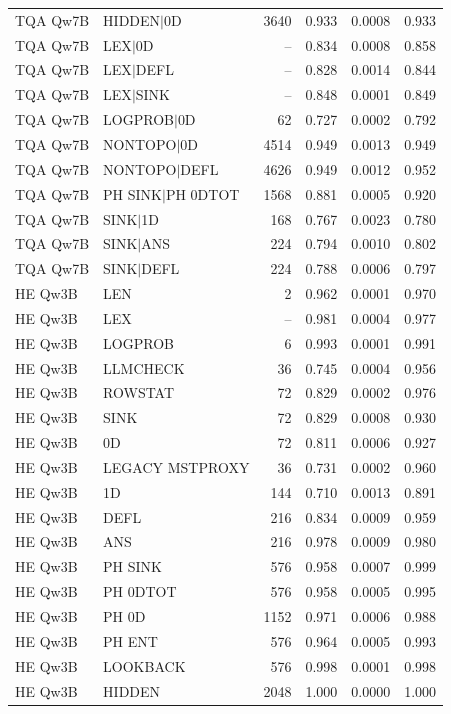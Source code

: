 \begin{longtable}{llrrrr}
TQA Qw7B & HIDDEN$\mid$0D & 3640 & 0.933 & 0.0008 & 0.933 \\
TQA Qw7B & LEX$\mid$0D & -- & 0.834 & 0.0008 & 0.858 \\
TQA Qw7B & LEX$\mid$DEFL & -- & 0.828 & 0.0014 & 0.844 \\
TQA Qw7B & LEX$\mid$SINK & -- & 0.848 & 0.0001 & 0.849 \\
TQA Qw7B & LOGPROB$\mid$0D & 62 & 0.727 & 0.0002 & 0.792 \\
TQA Qw7B & NONTOPO$\mid$0D & 4514 & 0.949 & 0.0013 & 0.949 \\
TQA Qw7B & NONTOPO$\mid$DEFL & 4626 & 0.949 & 0.0012 & 0.952 \\
TQA Qw7B & PH SINK$\mid$PH 0DTOT & 1568 & 0.881 & 0.0005 & 0.920 \\
TQA Qw7B & SINK$\mid$1D & 168 & 0.767 & 0.0023 & 0.780 \\
TQA Qw7B & SINK$\mid$ANS & 224 & 0.794 & 0.0010 & 0.802 \\
TQA Qw7B & SINK$\mid$DEFL & 224 & 0.788 & 0.0006 & 0.797 \\
HE Qw3B & LEN & 2 & 0.962 & 0.0001 & 0.970 \\
HE Qw3B & LEX & -- & 0.981 & 0.0004 & 0.977 \\
HE Qw3B & LOGPROB & 6 & 0.993 & 0.0001 & 0.991 \\
HE Qw3B & LLMCHECK & 36 & 0.745 & 0.0004 & 0.956 \\
HE Qw3B & ROWSTAT & 72 & 0.829 & 0.0002 & 0.976 \\
HE Qw3B & SINK & 72 & 0.829 & 0.0008 & 0.930 \\
HE Qw3B & 0D & 72 & 0.811 & 0.0006 & 0.927 \\
HE Qw3B & LEGACY MSTPROXY & 36 & 0.731 & 0.0002 & 0.960 \\
HE Qw3B & 1D & 144 & 0.710 & 0.0013 & 0.891 \\
HE Qw3B & DEFL & 216 & 0.834 & 0.0009 & 0.959 \\
HE Qw3B & ANS & 216 & 0.978 & 0.0009 & 0.980 \\
HE Qw3B & PH SINK & 576 & 0.958 & 0.0007 & 0.999 \\
HE Qw3B & PH 0DTOT & 576 & 0.958 & 0.0005 & 0.995 \\
HE Qw3B & PH 0D & 1152 & 0.971 & 0.0006 & 0.988 \\
HE Qw3B & PH ENT & 576 & 0.964 & 0.0005 & 0.993 \\
HE Qw3B & LOOKBACK & 576 & 0.998 & 0.0001 & 0.998 \\
HE Qw3B & HIDDEN & 2048 & 1.000 & 0.0000 & 1.000 \\

\end{longtable}
